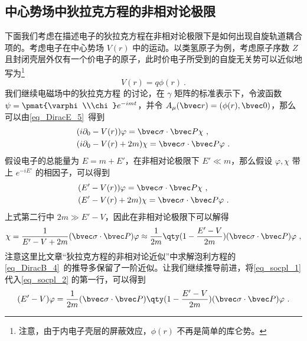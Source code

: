 \subsection{中心势场中狄拉克方程的非相对论极限}
\cite{曾谨言}下面我们考虑在描述电子的狄拉克方程在非相对论极限下是如何出现自旋轨道耦合项的。考虑电子在中心势场 $V(r)$ 中的运动。以类氢原子为例，考虑原子序数 $Z$ 且封闭壳层外仅有一个价电子的原子，此时价电子所受到的自旋无关势可以近似地写为\footnote{注意，由于内电子壳层的屏蔽效应，$\phi(r)$ 不再是简单的库仑势。}
\begin{equation}
V(r)=q\phi(r)~.
\end{equation}
我们继续电磁场中的狄拉克方程 的讨论，在 $\gamma$ 矩阵的标准表示下，令波函数 $\psi=\pmat{\varphi\\\chi}e^{-imt}$，并令 $A_\mu(\bvec r)=(\phi(r),\bvec 0)$，那么可以由\autoref{eq_DiracE_5}~得到
\begin{equation}
\begin{aligned}
&(i\partial_0 - V(r))\varphi = \bvec \sigma\cdot \bvec P \chi~,\\
&(i\partial_0 - V(r) + 2m) \chi = \bvec \sigma\cdot \bvec P  \varphi~.
\end{aligned}
\end{equation}
假设电子的总能量为 $E=m+E'$，在非相对论极限下 $E'\ll m$，那么假设 $\varphi,\chi$ 带上 $e^{-iE'}$ 的相因子，可以得到
\begin{equation}\label{eq_socpl_2}
\begin{aligned}
&(E' - V(r))\varphi = \bvec \sigma\cdot \bvec P \chi~,\\
&(E' - V(r) + 2m) \chi = \bvec \sigma\cdot \bvec P  \varphi~.
\end{aligned}
\end{equation}
上式第二行中 $2m\gg E'-V$，因此在非相对论极限下可以解得
\begin{equation}\label{eq_socpl_1}
\chi = \frac{1}{E'-V+2m}(\bvec \sigma\cdot \bvec P)\varphi
\approx\frac{1}{2m}\qty(1-\frac{E'-V}{2m})(\bvec \sigma\cdot \bvec P) \varphi~,
\end{equation}
注意这里比文章“狄拉克方程的非相对论近似”中求解泡利方程的\autoref{eq_DiracB_4}~的推导多保留了一阶近似。让我们继续推导前进，将\autoref{eq_socpl_1} 代入\autoref{eq_socpl_2} 的第一行，可以得到
\begin{equation}
(E'-V)\varphi = \frac{1}{2m}(\bvec \sigma\cdot \bvec P)\qty(1-\frac{E'-V}{2m})(\bvec \sigma\cdot \bvec P)\varphi~.
\end{equation}
